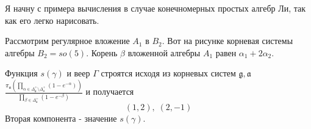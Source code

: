 \documentclass[a4paper,12pt]{article}
\theoremstyle{definition} \newtheorem{Def}{Definition}
\begin{document}
Я начну с примера вычисления в случае конечномерных простых алгебр Ли, так как его легко нарисовать.

Рассмотрим регулярное вложение  $A_1$ в $B_2$. Вот на рисунке корневая системы алгебры $B_2=so(5)$.
Корень  $\beta$ вложенной алгебры $A_1$ равен $\alpha_1+2\alpha_2$.

Функция $s(\gamma)$ и веер $\Gamma$ строятся исходя из корневых систем $\mathfrak{g}, \mathfrak{a}$
$\frac{\pi_{\mathfrak{a}}\left(\prod_{\alpha\in \Delta^{+}_{\mathfrak{g}}\setminus
      \Delta^{+}_{\mathfrak{a}}} \left(1-e^{-\alpha}\right) \right)}{\prod_{\beta\in
    \Delta^{+}_{\mathfrak{a}}} \left(1-e^{-\beta}\right) }$ и получается
\begin{equation}
  \label{eq:22}
  (1,2),\; (2,-1)
\end{equation}
Вторая компонента - значение $s(\gamma)$.
\end{document}
